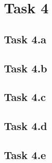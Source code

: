 \section{Task 4}
\subsection{Task 4.a}
\subsection{Task 4.b}
\subsection{Task 4.c}
\subsection{Task 4.d}
\subsection{Task 4.e}
